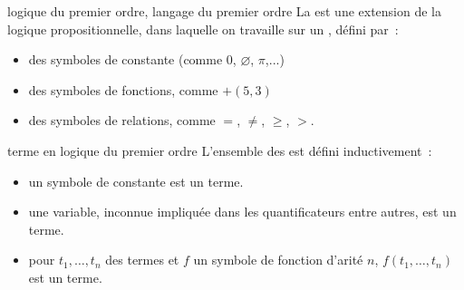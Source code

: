 \begin{adjustwidth}{-3cm}{-3cm}
\begin{definition}{7.20}{logique du premier ordre, langage du premier ordre}
    La  est une extension de la logique propositionnelle, dans laquelle on travaille sur un , défini par~:
    \begin{itemize}
        \item des symboles de constante (comme $0$, $\varnothing$, $\pi$,...)
        \item des symboles de fonctions, comme $+ (5,3)$
        \item des symboles de relations, comme $=$, $\neq$, $\geq$, $>$.
    \end{itemize}
\end{definition}

\begin{definition}{7.21}{terme en logique du premier ordre}
    L'ensemble des  est défini inductivement~:
    \begin{itemize}
        \item un symbole de constante est un terme.
        \item une variable, inconnue impliquée dans les quantificateurs entre autres, est un terme.
        \item pour $t_1, \dots, t_n$ des termes et $f$ un symbole de fonction d'arité $n$, $f(t_1, \dots, t_n)$ est un terme.
    \end{itemize}
\end{definition}


\end{adjustwidth}
